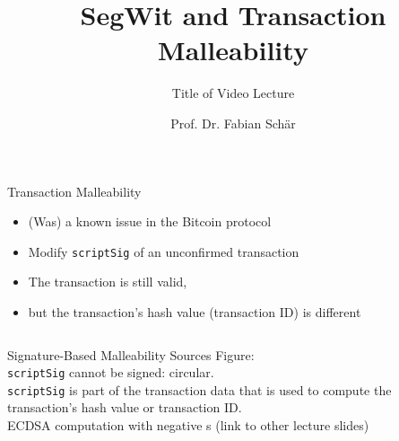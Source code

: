 \documentclass[]{beamer}
\title{SegWit and Transaction Malleability}
\subtitle{Title of Video Lecture}
\author{Prof. Dr. Fabian Schär}
\institute{University of Basel}
\begin{document}
\thispagestyle{empty}
\begin{frame}[noframenumbering]
	\titlepage
\end{frame}


\begin{frame}{Transaction Malleability}
	\begin{itemize}
		\item (Was) a known issue in the Bitcoin protocol
		\item<2-> Modify \texttt{scriptSig} of an unconfirmed transaction
		\item<3-> The transaction is still valid, 
		\item<4-> but the transaction's hash value (transaction ID) is different	
	\end{itemize}
	\vspace{1.5em}
	\begin{columns}[T]
	\end{columns}
	\vspace{1.5em}
\end{frame}

\begin{frame}{Signature-Based Malleability Sources}
	Figure:\\
	\texttt{scriptSig} cannot be signed: circular.\\
	\texttt{scriptSig} is part of the transaction data that is used to compute the transaction's hash value or transaction ID.\\
	\vspace{1.5em}
	ECDSA computation with negative s (link to other lecture slides)\\
\end{frame}
\end{document}
